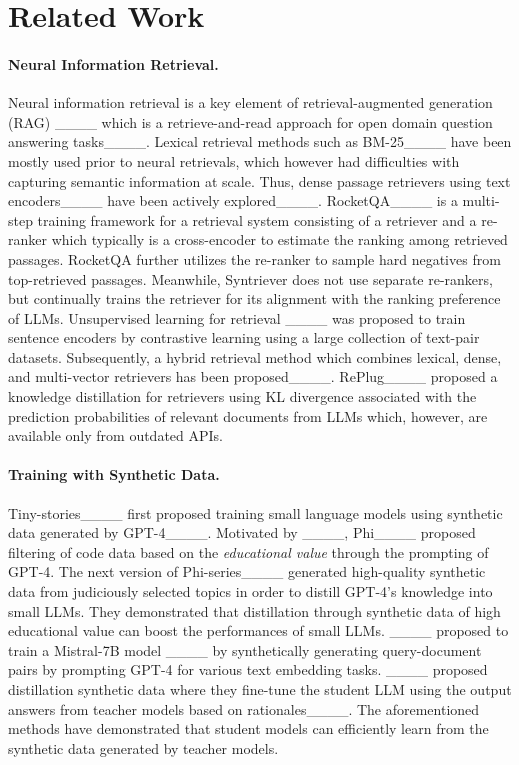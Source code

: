\section{Related Work}
\paragraph{Neural Information Retrieval.}
Neural information retrieval is a key element of retrieval-augmented generation (RAG) ____ which is a retrieve-and-read approach for open domain question answering tasks____. 
Lexical retrieval methods such as BM-25____ have been mostly used prior to neural retrievals, which however had difficulties with capturing semantic information at scale. Thus, dense passage retrievers using text encoders____ have been actively explored____. 
RocketQA____ is a multi-step training framework for a retrieval system consisting of a retriever and a re-ranker which typically is a cross-encoder to estimate the ranking among retrieved passages. RocketQA further utilizes the re-ranker to sample hard negatives from top-retrieved passages. Meanwhile, Syntriever does not use separate re-rankers, but continually trains the retriever for its alignment with the ranking preference of LLMs.
Unsupervised learning for retrieval ____ was proposed to train sentence encoders by contrastive learning using a large collection of text-pair datasets. Subsequently, a hybrid retrieval method which combines lexical, dense, and multi-vector retrievers has been proposed____. RePlug____ proposed a knowledge distillation for retrievers using KL divergence associated with the prediction probabilities of relevant documents from LLMs which, however, are available only from outdated APIs. 

\paragraph{Training with Synthetic Data.}
Tiny-stories____ first proposed training small language models using synthetic data generated by GPT-4____. Motivated by ____, Phi____ proposed filtering of code data based on the \emph{educational value} through the prompting of GPT-4.
The next version of Phi-series____ generated high-quality synthetic data from judiciously selected topics in order to distill GPT-4's knowledge into small LLMs. They demonstrated that distillation through synthetic data of high educational value can boost the performances of small LLMs. ____ proposed to train a Mistral-7B model ____ by synthetically generating query-document pairs by prompting GPT-4 for various text embedding tasks. 
____ proposed distillation synthetic data where they fine-tune the student LLM using the output answers from teacher models
based on rationales____. The aforementioned methods have demonstrated that student models can efficiently learn from the synthetic data generated by teacher models.